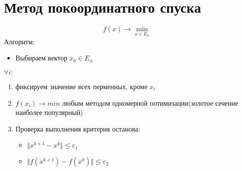 \documentclass[english]{article}
\theoremstyle{plain}
\theoremstyle{remark}
\theoremstyle{definition}
\begin{document}
\section{Метод покоординатного спуска}
\label{sec:org2fc042b}
\[ f(x) \to \min_{x \in E_n} \]
Алгоритм:
\begin{itemize}
\item Выбираем вектор \(x_0 \in E_n\) \\
\end{itemize}
\(\forall i:\)
\begin{enumerate}
\item фиксируем значение всех перменных, кроме \(x_i\)
\item \(f(x_i) \to min\) любым методом одномерной оптимизации(золотое сечение наиболее популярный)
\item Проверка выполнения критерия останова:
\begin{itemize}
\item \(\Vert x^{k + 1} - x^{k} \Vert \le \varepsilon_1\)
\item \(\Vert f(x^{k + 1}) - f(x^k) \Vert \le \varepsilon_2\)
\end{itemize}
\end{enumerate}
\end{document}
